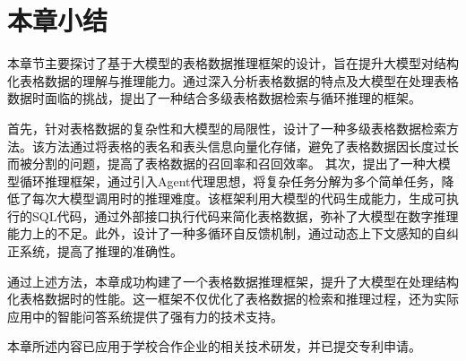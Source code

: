 \section{本章小结}
本章节主要探讨了基于大模型的表格数据推理框架的设计，旨在提升大模型对结构化表格数据的理解与推理能力。通过深入分析表格数据的特点及大模型在处理表格数据时面临的挑战，提出了一种结合多级表格数据检索与循环推理的框架。

首先，针对表格数据的复杂性和大模型的局限性，设计了一种多级表格数据检索方法。该方法通过将表格的表名和表头信息向量化存储，避免了表格数据因长度过长而被分割的问题，提高了表格数据的召回率和召回效率。
其次，提出了一种大模型循环推理框架，通过引入Agent代理思想，将复杂任务分解为多个简单任务，降低了每次大模型调用时的推理难度。该框架利用大模型的代码生成能力，生成可执行的SQL代码，通过外部接口执行代码来简化表格数据，弥补了大模型在数字推理能力上的不足。此外，设计了一种多循环自反馈机制，通过动态上下文感知的自纠正系统，提高了推理的准确性。

通过上述方法，本章成功构建了一个表格数据推理框架，提升了大模型在处理结构化表格数据时的性能。这一框架不仅优化了表格数据的检索和推理过程，还为实际应用中的智能问答系统提供了强有力的技术支持。

本章所述内容已应用于学校合作企业的相关技术研发，并已提交专利申请。
